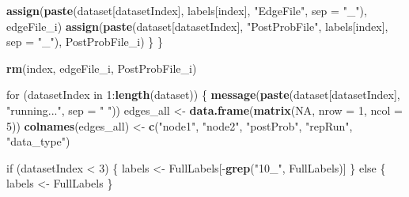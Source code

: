\documentclass[]{article}
\newenvironment{Shaded}{\begin{snugshade}}{\end{snugshade}}
\newcommand{\KeywordTok}[1]{\textcolor[rgb]{0.13,0.29,0.53}{\textbf{{#1}}}}
\newcommand{\DataTypeTok}[1]{\textcolor[rgb]{0.13,0.29,0.53}{{#1}}}
\newcommand{\DecValTok}[1]{\textcolor[rgb]{0.00,0.00,0.81}{{#1}}}
\newcommand{\StringTok}[1]{\textcolor[rgb]{0.31,0.60,0.02}{{#1}}}
\newcommand{\OtherTok}[1]{\textcolor[rgb]{0.56,0.35,0.01}{{#1}}}
\newcommand{\NormalTok}[1]{{#1}}
\begin{document}
\begin{Shaded}
\begin{Highlighting}[]
        \KeywordTok{assign}\NormalTok{(}\KeywordTok{paste}\NormalTok{(dataset[datasetIndex], labels[index], }\StringTok{"EdgeFile"}\NormalTok{, }
            \DataTypeTok{sep =} \StringTok{"_"}\NormalTok{), edgeFile_i)}
        \KeywordTok{assign}\NormalTok{(}\KeywordTok{paste}\NormalTok{(dataset[datasetIndex], }\StringTok{"PostProbFile"}\NormalTok{, labels[index], }
            \DataTypeTok{sep =} \StringTok{"_"}\NormalTok{), PostProbFile_i)}
    \NormalTok{\}}
\NormalTok{\}}

\KeywordTok{rm}\NormalTok{(index, edgeFile_i, PostProbFile_i)}

\NormalTok{for (datasetIndex in }\DecValTok{1}\NormalTok{:}\KeywordTok{length}\NormalTok{(dataset)) \{}
    \KeywordTok{message}\NormalTok{(}\KeywordTok{paste}\NormalTok{(dataset[datasetIndex], }\StringTok{"running..."}\NormalTok{, }\DataTypeTok{sep =} \StringTok{" "}\NormalTok{))}
    \NormalTok{edges_all <-}\StringTok{ }\KeywordTok{data.frame}\NormalTok{(}\KeywordTok{matrix}\NormalTok{(}\OtherTok{NA}\NormalTok{, }\DataTypeTok{nrow =} \DecValTok{1}\NormalTok{, }\DataTypeTok{ncol =} \DecValTok{5}\NormalTok{))}
    \KeywordTok{colnames}\NormalTok{(edges_all) <-}\StringTok{ }\KeywordTok{c}\NormalTok{(}\StringTok{"node1"}\NormalTok{, }\StringTok{"node2"}\NormalTok{, }\StringTok{"postProb"}\NormalTok{, }\StringTok{"repRun"}\NormalTok{, }
        \StringTok{"data_type"}\NormalTok{)}
    
    \NormalTok{if (datasetIndex <}\StringTok{ }\DecValTok{3}\NormalTok{) \{}
        \NormalTok{labels <-}\StringTok{ }\NormalTok{FullLabels[-}\KeywordTok{grep}\NormalTok{(}\StringTok{"10_"}\NormalTok{, FullLabels)]}
    \NormalTok{\} else \{}
        \NormalTok{labels <-}\StringTok{ }\NormalTok{FullLabels}
    \NormalTok{\}}
    

\end{Highlighting}
\end{Shaded}
\end{document}
